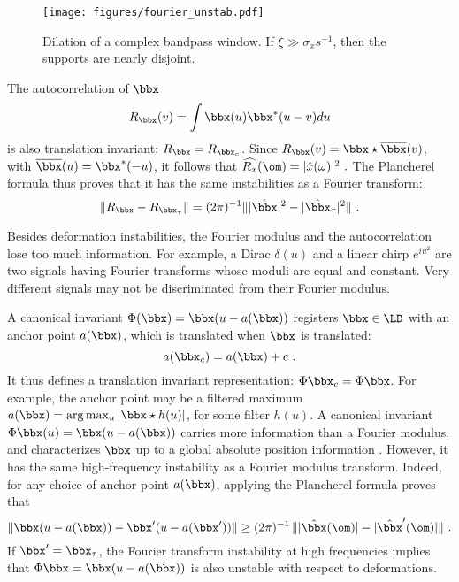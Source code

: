\begin{figure}[htp]
\centering
\texttt{[image: figures/fourier\_unstab.pdf]}
\caption{Dilation of a complex bandpass window. If $\xi \gg \sigma_x s^{-1}$, then the supports are nearly
disjoint.}
\label{fourier_unstab}
\end{figure}

The autocorrelation of $\bbx$
$$R_\bbx(v) = \int \bbx(u) \bbx^*(u-v) du$$ 
is also translation invariant: $R_\bbx = R_{\bbx_c}$.
Since $R_\bbx(v) = \bbx \star \overline{\bbx} (v)$, 
with $\overline{\bbx}(u) = \bbx^*(-u)$, it follows that
$\widehat {R_x} (\om) = |\hat x (\omega)|^2~.$
The Plancherel formula thus proves that it has the same instabilities
as a Fourier transform:
\[
\| R_\bbx - R_{\bbx_\tau} \|= (2 \pi)^{-1} \| |\hat{\bbx}|^2 - |\hat{\bbx}_\tau|^2 \|~.
\]

Besides deformation instabilities, 
the Fourier modulus and the autocorrelation lose 
too much information.
For example,
a Dirac $\delta (u)$ and a linear chirp $e^{i u^2}$ are two
signals having Fourier
transforms whose moduli are equal and constant. 
Very different signals
may not be discriminated from their Fourier modulus.

A canonical invariant \cite{mnist_deformation,Soatto}
$\Phi(\bbx) = \bbx(u -a(\bbx))$ registers $\bbx \in \LD$ with 
an anchor point $a(\bbx)$, which is translated when $\bbx$ is translated:
$$a(\bbx_c) = a(\bbx) + c~.$$ 
It thus defines a translation invariant representation: $\Phi \bbx_c = \Phi \bbx$.
For example, the anchor point may be a filtered
maximum $a(\bbx) = \arg \max_{u} |\bbx \star h(u)|$,
for some filter $h(u)$.
A canonical invariant $\Phi \bbx(u) = \bbx(u - a(\bbx))$ 
carries more information
than a Fourier modulus, and characterizes $\bbx$ up to 
a global absolute position information \cite{Soatto}.
However, it has the same high-frequency instability
as a Fourier modulus transform. Indeed, for any choice of anchor
point $a(\bbx)$, applying
the Plancherel formula proves that
\[
\| \bbx(u-a(\bbx)) - \bbx'(u-a(\bbx')) \|\geq (2 \pi)^{-1}\,\||\hat \bbx(\om)| - |\hat \bbx'(\om)| \| ~.
\]
If $\bbx' = \bbx_\tau$, 
the Fourier transform instability at high frequencies implies that
$\Phi \bbx = \bbx(u-a(\bbx))$ is also unstable with respect to deformations.

